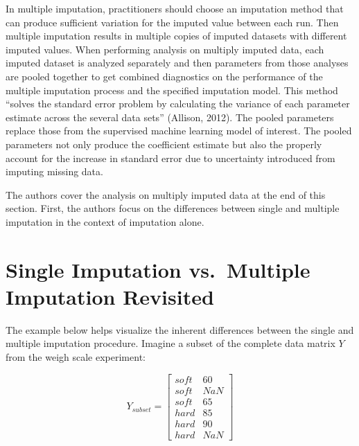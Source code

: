 \documentclass[12pt,oneside]{chicagocapstone}
\begin{document}
In multiple imputation, practitioners should choose an imputation method
that can produce sufficient variation for the imputed value between each
run. Then multiple imputation results in multiple copies of imputed
datasets with different imputed values. When performing analysis on
multiply imputed data, each imputed dataset is analyzed separately and
then parameters from those analyses are pooled together to get combined
diagnostics on the performance of the multiple imputation process and
the specified imputation model. This method ``solves the standard error
problem by calculating the variance of each parameter estimate across
the several data sets'' (Allison, 2012). The pooled parameters replace
those from the supervised machine learning model of interest. The pooled
parameters not only produce the coefficient estimate but also the
properly account for the increase in standard error due to uncertainty
introduced from imputing missing data.

The authors cover the analysis on multiply imputed data at the end of
this section. First, the authors focus on the differences between single
and multiple imputation in the context of imputation alone.

\section*{Single Imputation vs.~Multiple Imputation
Revisited}\label{background-example}

The example below helps visualize the inherent differences between the
single and multiple imputation procedure. Imagine a subset of the
complete data matrix \(Y\) from the weigh scale experiment:

\[Y_{subset}=\begin{bmatrix}soft & 60 \\ soft & NaN \\ soft & 65 \\ hard & 85 \\ hard & 90 \\ hard & NaN \end{bmatrix}\]
\end{document}
